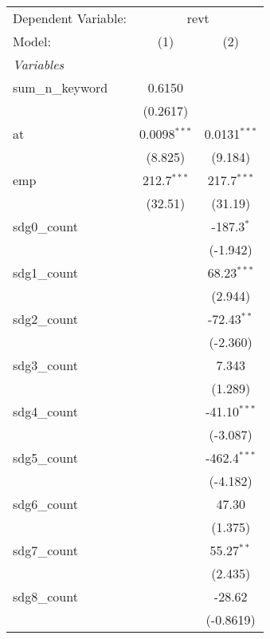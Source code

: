 
\begingroup
\centering
\begin{tabular}{lcc}
   \tabularnewline \midrule \midrule
   Dependent Variable: & \multicolumn{2}{c}{revt}\\
   Model:            & (1)            & (2)\\  
   \midrule
   \emph{Variables}\\
   sum\_n\_keyword   & 0.6150         &   \\   
                     & (0.2617)       &   \\   
   at                & 0.0098$^{***}$ & 0.0131$^{***}$\\   
                     & (8.825)        & (9.184)\\   
   emp               & 212.7$^{***}$  & 217.7$^{***}$\\   
                     & (32.51)        & (31.19)\\   
   sdg0\_count       &                & -187.3$^{*}$\\   
                     &                & (-1.942)\\   
   sdg1\_count       &                & 68.23$^{***}$\\   
                     &                & (2.944)\\   
   sdg2\_count       &                & -72.43$^{**}$\\   
                     &                & (-2.360)\\   
   sdg3\_count       &                & 7.343\\   
                     &                & (1.289)\\   
   sdg4\_count       &                & -41.10$^{***}$\\   
                     &                & (-3.087)\\   
   sdg5\_count       &                & -462.4$^{***}$\\   
                     &                & (-4.182)\\   
   sdg6\_count       &                & 47.30\\   
                     &                & (1.375)\\   
   sdg7\_count       &                & 55.27$^{**}$\\   
                     &                & (2.435)\\   
   sdg8\_count       &                & -28.62\\   
                     &                & (-0.8619)\\   

\end{tabular}
